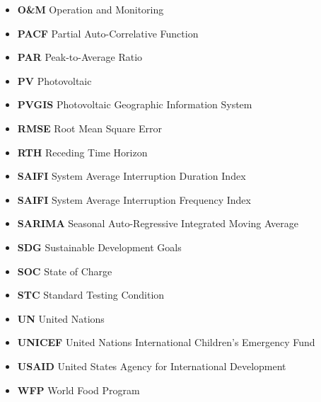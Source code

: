 \begin{itemize}
    \item \textbf{O\&M} Operation and Monitoring
    \item \textbf{PACF} Partial Auto-Correlative Function
    \item \textbf{PAR} Peak-to-Average Ratio
    \item \textbf{PV} Photovoltaic 
    \item \textbf{PVGIS} Photovoltaic Geographic Information System
    \item \textbf{RMSE} Root Mean Square Error
    \item \textbf{RTH} Receding Time Horizon
    \item \textbf{SAIFI} System Average Interruption Duration Index
    \item \textbf{SAIFI} System Average Interruption Frequency Index
    \item \textbf{SARIMA} Seasonal Auto-Regressive Integrated Moving Average
    \item \textbf{SDG} Sustainable Development Goals
    \item \textbf{SOC} State of Charge
    \item \textbf{STC} Standard Testing Condition
    \item \textbf{UN} United Nations
    \item \textbf{UNICEF} United Nations International Children's Emergency Fund
    \item \textbf{USAID} United States Agency for International Development
    \item \textbf{WFP} World Food Program
\end{itemize}